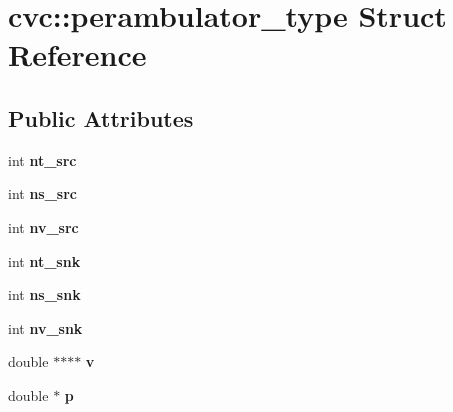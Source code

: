 \hypertarget{structcvc_1_1perambulator__type}{\section{cvc\-:\-:perambulator\-\_\-type Struct Reference}
\label{structcvc_1_1perambulator__type}
}
\subsection*{Public Attributes}
\begin{DoxyCompactItemize}
\item 
\hypertarget{structcvc_1_1perambulator__type_aba1ea07ef3c6e00809ef9894ce901338}{int {\bfseries nt\-\_\-src}}\label{structcvc_1_1perambulator__type_aba1ea07ef3c6e00809ef9894ce901338}

\item 
\hypertarget{structcvc_1_1perambulator__type_ab8a35668711f71f92ced072d01edace5}{int {\bfseries ns\-\_\-src}}\label{structcvc_1_1perambulator__type_ab8a35668711f71f92ced072d01edace5}

\item 
\hypertarget{structcvc_1_1perambulator__type_accae860053808b67ad8eb2804ecea5c2}{int {\bfseries nv\-\_\-src}}\label{structcvc_1_1perambulator__type_accae860053808b67ad8eb2804ecea5c2}

\item 
\hypertarget{structcvc_1_1perambulator__type_a79bc70c2e7b421a4b27620d18688157a}{int {\bfseries nt\-\_\-snk}}\label{structcvc_1_1perambulator__type_a79bc70c2e7b421a4b27620d18688157a}

\item 
\hypertarget{structcvc_1_1perambulator__type_a559beb6ae6a321dcb05254e25d2249b5}{int {\bfseries ns\-\_\-snk}}\label{structcvc_1_1perambulator__type_a559beb6ae6a321dcb05254e25d2249b5}

\item 
\hypertarget{structcvc_1_1perambulator__type_a0c05abe1932466a80f60e60ba7cf3487}{int {\bfseries nv\-\_\-snk}}\label{structcvc_1_1perambulator__type_a0c05abe1932466a80f60e60ba7cf3487}

\item 
\hypertarget{structcvc_1_1perambulator__type_a9935349fd62e7b564a6f3f467c15702c}{double $\ast$$\ast$$\ast$$\ast$ {\bfseries v}}\label{structcvc_1_1perambulator__type_a9935349fd62e7b564a6f3f467c15702c}

\item 
\hypertarget{structcvc_1_1perambulator__type_a6bc76a7d1d525acbc407e5ad2f4a843c}{double $\ast$ {\bfseries p}}\label{structcvc_1_1perambulator__type_a6bc76a7d1d525acbc407e5ad2f4a843c}


\end{DoxyCompactItemize}
